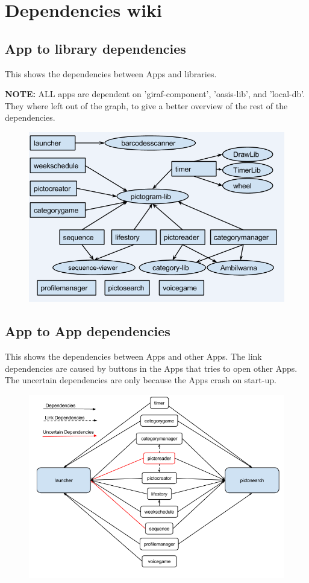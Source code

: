 \section{Dependencies wiki}
\subsection{App to library dependencies}
This shows the dependencies between Apps and libraries. 

\textbf{NOTE:} ALL apps are dependent on 'giraf-component', 'oasis-lib', and 'local-db'. They where left out of the graph, to give a better overview of the rest of the dependencies.

\begin{figure}[H]
	\centering
	\includegraphics[width=0.8 \textwidth]{pictures/AppLibDependenciesWiki.png}
	\caption{}
	\label{AppLibDependenciesWiki}
\end{figure}

\subsection{App to App dependencies}
This shows the dependencies between Apps and other Apps. The link dependencies are caused by buttons in the Apps that tries to open other Apps. The uncertain dependencies are only because the Apps crash on start-up.

\begin{figure}[H]
	\centering
	\includegraphics[width=0.8 \textwidth]{pictures/AppAppDependenciesWiki.png}
	\caption{}
	\label{LibLibDependenciesWiki}
\end{figure}

